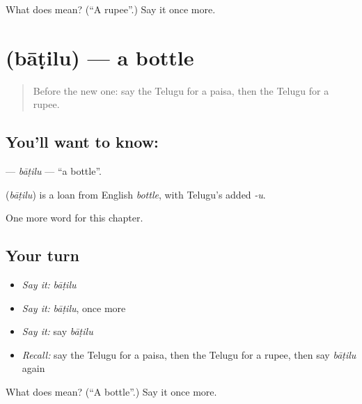 \begin{tcolorbox}[breakable,colback=teal!4,colframe=teal!35!black,title={Before you move on}]
What does  mean? (\textquotedblleft{}A rupee\textquotedblright{}.) Say it once more.
\end{tcolorbox}
\section[\texorpdfstring{\te{బాటిలు} (bāṭilu)}{బాటిలు (bāṭilu)}]{ (bāṭilu) — a bottle}

\label{lesson:TE-C131-batilu}



\begin{quote}
Before the new one: say the Telugu for a paisa, then the Telugu for a rupee.
\end{quote}

\subsection*{You'll want to know: }
\textbf{} — \emph{bāṭilu} — \textquotedblleft{}a bottle\textquotedblright{}.

\begin{cousinweb}
\textbf{} (\emph{bāṭilu}) is a loan from English \emph{bottle}, with Telugu's added \emph{-u}.
\end{cousinweb}

\begin{grammarlens}[title={What you've built}]
One more word for this chapter.
\end{grammarlens}

\subsection*{Your turn}
\begin{itemize}
\raggedright
  \item \emph{Say it:} \emph{bāṭilu}
  \item \emph{Say it:} \emph{bāṭilu}, once more
  \item \emph{Say it:} say \emph{bāṭilu}
  \item \emph{Recall:} say the Telugu for a paisa, then the Telugu for a rupee, then say \emph{bāṭilu} again
\end{itemize}

\begin{tcolorbox}[breakable,colback=teal!4,colframe=teal!35!black,title={Before you move on}]
What does  mean? (\textquotedblleft{}A bottle\textquotedblright{}.) Say it once more.
\end{tcolorbox}
